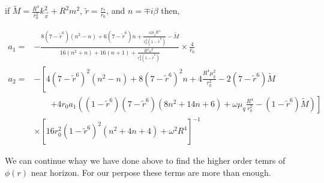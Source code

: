if $\tilde{M} = \frac{R^4}{r_0^2}k_{\vec{x}}^2+R^2m^2$, $\tilde{r}=\frac{r_*}{r_0}$, and $n = \mp i\beta$ then,


\begin{align}
    a_1 =& -\frac{8(7-\tilde{r}^6)(n^2-n)+6(7-\tilde{r}^6)n+\frac{\omega\mu_qR^4}{r_0^2(1-\tilde{r}^6)}-\tilde{M}}{16(n^2+n)+16(n+1)+\frac{R^4\omega^2}{r_0^2(1-\tilde{r}^6)}} \times \frac{4}{r_0} \nonumber\\      
%    
    a_2 =& -\left[4(7-\tilde{r}^6)^2(n^2-n) + 8(7-\tilde{r}^6)^2n + 4\frac{R^4\mu_q^2}{r_0^2} - 2(7-\tilde{r}^6)\tilde{M} \right.\nonumber\\
         & \qquad \left. + 4r_0a_1\left((1-\tilde{r}^6)(7-\tilde{r}^6)(8n^2+14n+6) + \omega\mu_q\frac{R^4}{r_0^2} - (1-\tilde{r}^6)\tilde{M} \right) \right] \nonumber\\
         & \times \left[ 16r_0^2(1-\tilde{r}^6)^2(n^2 + 4n + 4) + \omega^2R^4 \right]^{-1} 
\end{align}

We can continue whay we have done above to find the higher order temrs of $\phi(r)$ near horizon. For our perpose these terms are more than enough.

